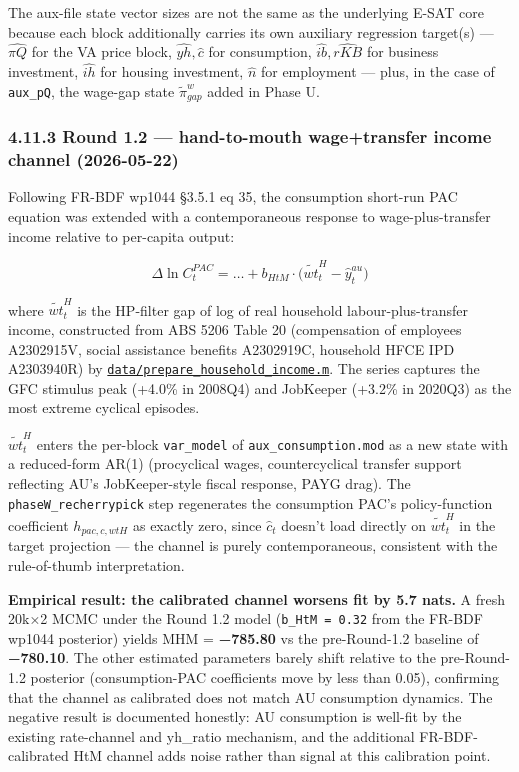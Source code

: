 \documentclass[
]{article}
\begin{document}
The aux-file state vector sizes are not the same as the underlying E-SAT
core because each block additionally carries its own auxiliary
regression target(s) --- \(\widehat{\pi Q}\) for the VA price block,
\(\widehat{yh}, \widehat{c}\) for consumption,
\(\widehat{ib}, \widehat{rKB}\) for business investment,
\(\widehat{ih}\) for housing investment, \(\widehat{n}\) for employment
--- plus, in the case of \texttt{aux\_pQ}, the wage-gap state
\(\tilde{\pi}^w_{gap}\) added in Phase U.

\subsubsection{4.11.3 Round 1.2 --- hand-to-mouth wage+transfer income
channel
(2026-05-22)}\label{round-1.2-hand-to-mouth-wagetransfer-income-channel-2026-05-22}

Following FR-BDF wp1044 §3.5.1 eq 35, the consumption short-run PAC
equation was extended with a contemporaneous response to
wage-plus-transfer income relative to per-capita output:

\[\Delta \ln C^{PAC}_t = \dots + b_{HtM} \cdot \bigl(\widetilde{wt}^H_t - \hat{y}^{au}_t\bigr)\]

where \(\widetilde{wt}^H_t\) is the HP-filter gap of log of real
household labour-plus-transfer income, constructed from ABS 5206 Table
20 (compensation of employees A2302915V, social assistance benefits
A2302919C, household HFCE IPD A2303940R) by
\href{../data/prepare_household_income.m}{\texttt{data/prepare\_household\_income.m}}.
The series captures the GFC stimulus peak (+4.0\% in 2008Q4) and
JobKeeper (+3.2\% in 2020Q3) as the most extreme cyclical episodes.

\(\widetilde{wt}^H_t\) enters the per-block \texttt{var\_model} of
\texttt{aux\_consumption.mod} as a new state with a reduced-form AR(1)
(procyclical wages, countercyclical transfer support reflecting AU's
JobKeeper-style fiscal response, PAYG drag). The
\texttt{phaseW\_recherrypick} step regenerates the consumption PAC's
policy-function coefficient \(h_{pac,c,wtH}\) as exactly zero, since
\(\widehat{c}_t\) doesn't load directly on \(\widetilde{wt}^H_t\) in the
target projection --- the channel is purely contemporaneous, consistent
with the rule-of-thumb interpretation.

\textbf{Empirical result: the calibrated channel worsens fit by 5.7
nats.} A fresh 20k×2 MCMC under the Round 1.2 model
(\texttt{b\_HtM\ =\ 0.32} from the FR-BDF wp1044 posterior) yields MHM =
\textbf{−785.80} vs the pre-Round-1.2 baseline of \textbf{−780.10}. The
other estimated parameters barely shift relative to the pre-Round-1.2
posterior (consumption-PAC coefficients move by less than 0.05),
confirming that the channel as calibrated does not match AU consumption
dynamics. The negative result is documented honestly: AU consumption is
well-fit by the existing rate-channel and yh\_ratio mechanism, and the
additional FR-BDF-calibrated HtM channel adds noise rather than signal
at this calibration point.
\end{document}
